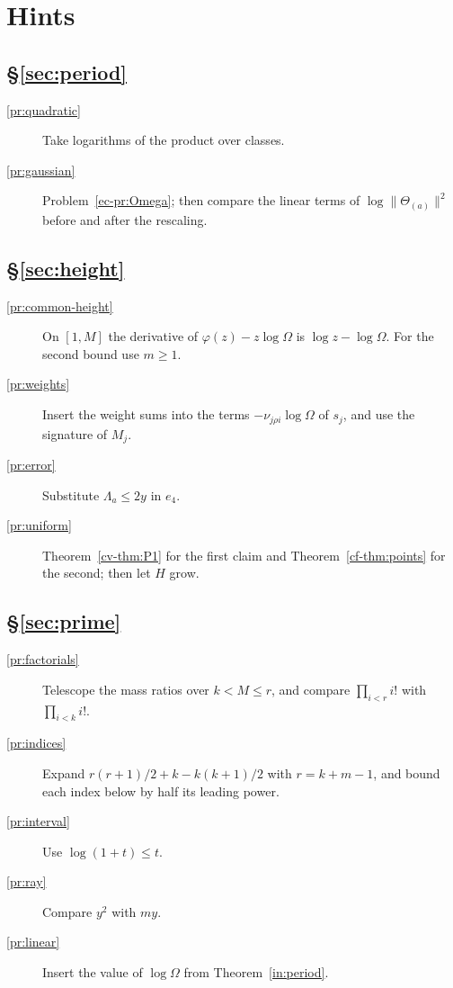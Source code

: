 \documentclass[reqno]{amsart}
\theoremstyle{definition}
\theoremstyle{plain}
\begin{document}
\section*{Hints}
\subsection*{\S\ref{sec:period}}
\begin{description}
\item[\ref{pr:quadratic}] Take logarithms of the product over classes.
\item[\ref{pr:gaussian}] Problem~\ref{ec-pr:Omega}; then compare the
linear terms of $\log\|\Theta_{(a)}\|^2$ before and after the rescaling.
\end{description}
\subsection*{\S\ref{sec:height}}
\begin{description}
\item[\ref{pr:common-height}] On $[1,M]$ the derivative of
$\varphi(z)-z\log\Omega$ is $\log z-\log\Omega$.  For the second
bound use $m\ge1$.
\item[\ref{pr:weights}] Insert the weight sums into the terms $-\nu_{j\rho i}\log\Omega$ of $s_j$, and use the signature of $M_j$.
\item[\ref{pr:error}] Substitute $\Lambda_a\le2y$ in $e_4$.
\item[\ref{pr:uniform}] Theorem~\ref{cv-thm:P1} for the first claim and
Theorem~\ref{cf-thm:points} for the second; then let $H$ grow.
\end{description}
\subsection*{\S\ref{sec:prime}}
\begin{description}
\item[\ref{pr:factorials}] Telescope the mass ratios over $k<M\le r$, and
compare $\prod_{i<r}i!$ with $\prod_{i<k}i!$.
\item[\ref{pr:indices}] Expand $r(r+1)/2+k-k(k+1)/2$ with $r=k+m-1$,
and bound each index below by half its leading power.
\item[\ref{pr:interval}] Use $\log(1+t)\le t$.
\item[\ref{pr:ray}] Compare $y^2$ with $my$.
\item[\ref{pr:linear}] Insert the value of $\log\Omega$ from
Theorem~\ref{in:period}.
\end{description}
\end{document}
